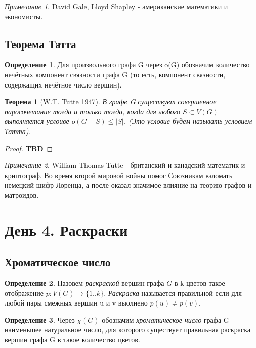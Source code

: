\documentclass{article}
\renewcommand{\le}{\leqslant}
\newtheorem{theorem}{Теорема}
\theoremstyle{definition}
\newtheorem{definition}{Определение}[section]
\theoremstyle{remark}
\newtheorem*{remark}{Примечание}
\begin{document}
\begin{remark}
     David Gale, Lloyd Shapley - американские математики и экономисты.
\end{remark}

\subsection{Теорема Татта}

\begin{definition}
    Для произвольного графа G через o(G) обозначим количество нечётных компонент связности графа G (то есть, компонент связности, содержащих нечётное число вершин).
\end{definition}

\begin{theorem} [W.T. Tutte 1947]
    В графе G существует совершенное паросочетание тогда и только тогда, когда для любого
    $S \subset V(G)$ выполняется услоиве $o(G-S) \le |S|$. (Это условие будем называть \textit{условием Татта}). 
\end{theorem}

\begin{proof}
    \textbf{TBD}
\end{proof}

\begin{remark}
    William Thomas Tutte - британский и канадский математик и криптограф. Во время второй мировой войны помог Союзникам взломать немецкий шифр Лоренца, а после оказал значимое влияние на теорию графов и матроидов.
\end{remark}

\section{День 4. Раскраски}

\subsection{Хроматическое число}

\begin{definition}
    Назовем \textit{раскраской} вершин графа $G$ в k цветов такое отображение 
    $p: V(G) \mapsto \{1..k\}$. \textit{Раскраска} называется правильной если для любой пары смежных вершин u и v выолнено $p(u) \not= p(v)$.
\end{definition}

\begin{definition}
    Через $\chi(G)$ обозначим \textit{хроматическое число} графа G — наименьшее натуральное число, для которого существует правильная раскраска вершин графа G в такое количество цветов.
\end{definition}
\end{document}
